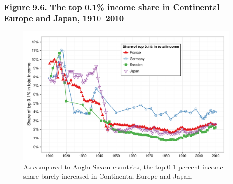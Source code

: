\documentclass[t]{beamer}\usepackage[]{graphicx}\usepackage[]{color}
\newenvironment{knitrout}{}{} %
\begin{document}
\begin{frame}[label=Figure_9_6]
\frametitle{Figure 9.6. The top 0.1\% income share in Continental Europe and Japan, 1910--2010}
\begin{figure}[t]
\begin{minipage}[b]{\textwidth}
\centering
\begin{knitrout}\footnotesize
{}\color{fgcolor}

{\centering \includegraphics[width=1\linewidth]{figures/color/Figure_9_6} 

}



\end{knitrout}
\caption{As compared to Anglo-Saxon countries, the top 0.1 percent income share barely increased in Continental Europe and Japan.}
\end{minipage}
\end{figure}
\end{frame}
\end{document}
